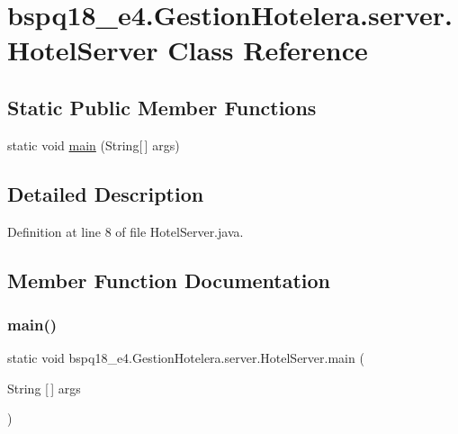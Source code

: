 \hypertarget{classbspq18__e4_1_1_gestion_hotelera_1_1server_1_1_hotel_server}{}\section{bspq18\+\_\+e4.\+Gestion\+Hotelera.\+server.\+Hotel\+Server Class Reference}
\label{classbspq18__e4_1_1_gestion_hotelera_1_1server_1_1_hotel_server}
\subsection*{Static Public Member Functions}
\begin{DoxyCompactItemize}
\item 
static void \mbox{\hyperlink{classbspq18__e4_1_1_gestion_hotelera_1_1server_1_1_hotel_server_a91565029fcc98dbebf0147dbc2b8e16e}{main}} (String\mbox{[}$\,$\mbox{]} args)
\end{DoxyCompactItemize}


\subsection{Detailed Description}


Definition at line 8 of file Hotel\+Server.\+java.



\subsection{Member Function Documentation}
\mbox{\label{classbspq18__e4_1_1_gestion_hotelera_1_1server_1_1_hotel_server_a91565029fcc98dbebf0147dbc2b8e16e}} 
\subsubsection{\texorpdfstring{main()}{main()}}
{\footnotesize\ttfamily static void bspq18\+\_\+e4.\+Gestion\+Hotelera.\+server.\+Hotel\+Server.\+main (\begin{DoxyParamCaption}\item[{String \mbox{[}$\,$\mbox{]}}]{args }\end{DoxyParamCaption})\hspace{0.3cm}{\ttfamily [static]}}



